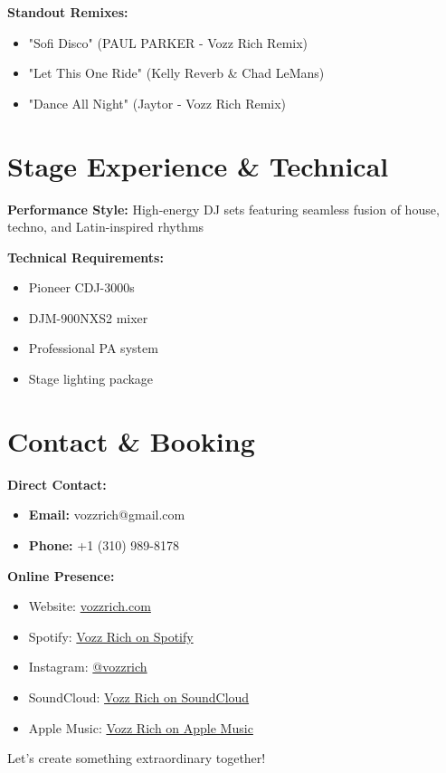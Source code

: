 \documentclass{article}
\begin{document}
\textbf{Standout Remixes:}
\begin{itemize}
\item "Sofi Disco" (PAUL PARKER - Vozz Rich Remix)
\item "Let This One Ride" (Kelly Reverb \& Chad LeMans)
\item "Dance All Night" (Jaytor - Vozz Rich Remix)
\end{itemize}

\section*{ Stage Experience \& Technical}
\textbf{Performance Style:} High-energy DJ sets featuring seamless fusion of house, techno, and Latin-inspired rhythms

\textbf{Technical Requirements:}
\begin{itemize}
\item Pioneer CDJ-3000s
\item DJM-900NXS2 mixer
\item Professional PA system
\item Stage lighting package
\end{itemize}

\section*{ Contact \& Booking}
\textbf{Direct Contact:}
\begin{itemize}
\item \textbf{Email:} vozzrich@gmail.com
\item \textbf{Phone:} +1 (310) 989-8178
\end{itemize}

\textbf{Online Presence:}
\begin{itemize}
\item Website: \href{https://vozzrich.com}{vozzrich.com}
\item Spotify: \href{https://open.spotify.com/artist/27sSKrytmUXukDnMGPXNHQ}{Vozz Rich on Spotify}
\item Instagram: \href{https://instagram.com/vozzrich}{@vozzrich}
\item SoundCloud: \href{https://soundcloud.com/vozzrich}{Vozz Rich on SoundCloud}
\item Apple Music: \href{https://music.apple.com/us/artist/vozz-rich/1675984686}{Vozz Rich on Apple Music}
\end{itemize}

\vspace{0.5cm}
\centerline{ Let's create something extraordinary together! }
\end{document}
